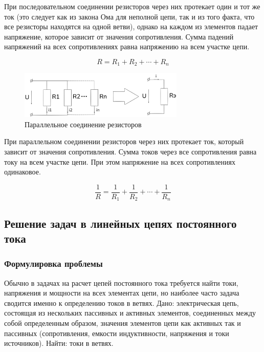 При последовательном соединении резисторов через них протекает один и тот же ток (это следует как из закона Ома для неполной цепи, так и из того факта, что все резисторы находятся на одной ветви), однако на каждом из элементов падает напряжение, которое зависит от значения сопротивления. Сумма падений напряжений на всех сопротивлениях равна напряжению на всем участке цепи.

\begin{equation}
    R = R_1 + R_2 + \cdots + R_n
    \label{eq:resistor_merge_series}
\end{equation}

\begin{figure}[H]
    \centering
    \includegraphics[width=0.7\textwidth]{images/image_2_resistor_merge.png}
    \caption{Параллельное соединение резисторов}
    \label{fig:graph9}
\end{figure}

При параллельном соединении резисторов через них протекает ток, который зависит от значения сопротивления. Сумма токов через все сопротивления равна току на всем участке цепи. При этом напряжение на всех сопротивлениях одинаковое.

\begin{equation}
    \frac{1}{R} = \frac{1}{R_1} + \frac{1}{R_2} + \cdots + \frac{1}{R_n}
    \label{eq:resistor_merge_parallel}
\end{equation}


\subsection{Решение задач в линейных цепях постоянного тока}

\subsubsection{Формулировка проблемы}
Обычно в задачах на расчет цепей постоянного тока требуется найти токи, напряжения и мощности на всех элементах цепи, но наиболее часто задача сводится именно к определению токов в ветвях.
Дано: электрическая цепь, состоящая из нескольких пассивных и активных элементов, соединенных между собой определенным образом, значения элементов цепи как активных так и пассивных (сопротивления, емкости индуктивности, напряжения и токи источников).
Найти: токи в ветвях.


